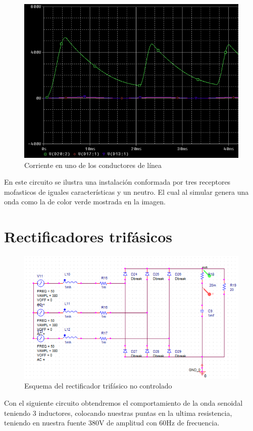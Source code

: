 \documentclass[12pt,a4paper]{article}
\begin{document}
\begin{figure}[hbtp]
\centering
\includegraphics[scale=0.45]{10.png}
\caption{Corriente en uno de los conductores de línea }
\end{figure}
En este circuito se ilustra una instalación conformada por tres receptores mofasticos de iguales características y un neutro. El cual al simular genera una onda como la de color verde mostrada en la imagen. 

\newpage
\section{Rectificadores trifásicos}
\begin{figure}[hbtp]
\centering
\includegraphics[scale=0.5]{11.png}
\caption{Esquema del rectificador trifásico no controlado}
\end{figure}
Con el siguiente circuito obtendremos el comportamiento de la onda senoidal teniendo 3 inductores, colocando nuestras puntas en la ultima resistencia, teniendo en nuestra fuente 380V de amplitud con 60Hz de frecuencia.
\end{document}
